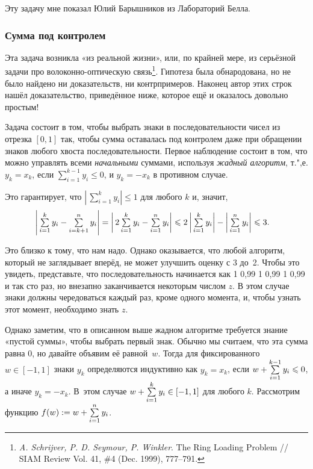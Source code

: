 \documentclass[twoside]{book}
\begin{document}
Эту задачу мне показал Юлий Барышников из Лабораторий Белла.

\subsubsection*{Сумма под контролем}

Эта задача возникла «из реальной жизни», или, по крайней мере, из серьёзной задачи про волоконно-оптическую связь\footnote{\emph{A. Schrijver, P. D. Seymour, P. Winkler}. The Ring Loading Problem /\!/ {SIAM Review} Vol. 41, \#4 (Dec. 1999), 777--791.}.
Гипотеза была обнародована, но не было найдено ни доказательств, ни контрпримеров.
Наконец автор этих строк нашёл доказательство, приведённое ниже, которое ещё и оказалось довольно простым!

\medskip

Задача состоит в том, чтобы выбрать знаки в последовательности чисел из отрезка $[0,1]$ так, чтобы сумма оставалась под контролем даже при обращении знаков любого хвоста последовательности.
Первое наблюдение состоит в том, что можно управлять всеми \emph{начальными} суммами, используя \emph{жадный алгоритм}, т.",е.  $y_k=x_k$, если $\sum\limits_{i=1}^{k-1}y_i \le 0$, и $y_k=-x_k$ в противном случае.

Это гарантирует, что $\left|\,\sum\limits_{i=1}^{k}y_i\right| \le 1$ для любого $k$ и, значит,
\begin{align*}
\left|\,\mathop{\textstyle\sum}\limits_{i=1}^{k}y_i-\mathop{\textstyle\sum}\limits_{i=k+1}^{n}y_i\right|&=\left|\,2\mathop{\textstyle\sum}\limits_{i=1}^{k}y_i-\mathop{\textstyle\sum}\limits_{i=1}^{n}y_i\right|
\leqslant2\left|\,\mathop{\textstyle\sum}\limits_{i=1}^{k}y_i\right|-\left|\,\mathop{\textstyle\sum}\limits_{i=1}^{n}y_i\right|\leqslant3.
\end{align*}

Это близко к тому, что нам надо. 
Однако оказывается, что любой алгоритм, который не заглядывает вперёд, не может улучшить оценку с 3 до~2.
Чтобы это увидеть, представьте, что последовательность начинается как
1\change{,}{;} 0,99\change{,}{;} 1\change{,}{;} 0,99\change{,}{;} 1\change{,}{;} 0,99 и так сто раз, но внезапно заканчивается некоторым числом $z$.
В этом случае знаки должны чередоваться каждый раз, кроме одного момента, и, чтобы узнать этот момент, необходимо знать $z$.

Однако заметим, что в описанном выше жадном алгоритме требуется знание «пустой суммы», чтобы выбрать первый знак.
Обычно мы считаем, что эта сумма равна 0, но давайте объявим её равной~$w$.
Тогда для фиксированного $w\in [-1,1]$ знаки $y_k$ определяются индуктивно как $y_k=x_k$, если $w+\mathop{\textstyle\sum}\limits_{i=1}^{k-1}y_i \leqslant 0$, а иначе $y_k=-x_k$.
В~этом случае $w+\mathop{\textstyle\sum}\limits_{i=1}^{k}y_i \in[-1,1]$ для любого $k$.
Рассмотрим функцию $f(w) := w+\mathop{\textstyle\sum}\limits_{i=1}^ny_i$.
\end{document}
